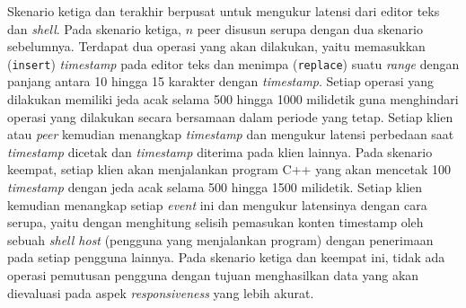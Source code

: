 Skenario ketiga dan terakhir berpusat untuk mengukur latensi dari editor teks dan \textit{shell}. Pada skenario ketiga, $n$ peer disusun serupa dengan dua skenario sebelumnya. Terdapat dua operasi yang akan dilakukan, yaitu memasukkan (\texttt{insert}) \textit{timestamp} pada editor teks dan menimpa (\texttt{replace}) suatu \textit{range} dengan panjang antara 10 hingga 15 karakter dengan \textit{timestamp}. Setiap operasi yang dilakukan memiliki jeda acak selama 500 hingga 1000 milidetik guna menghindari operasi yang dilakukan secara bersamaan dalam periode yang tetap. Setiap klien atau \textit{peer} kemudian menangkap \textit{timestamp} dan mengukur latensi perbedaan saat \textit{timestamp} dicetak dan \textit{timestamp} diterima pada klien lainnya. Pada skenario keempat, setiap klien akan menjalankan program C++ yang akan mencetak 100 \textit{timestamp} dengan jeda acak selama 500 hingga 1500 milidetik. Setiap klien kemudian menangkap setiap \textit{event} ini dan mengukur latensinya dengan cara serupa, yaitu dengan menghitung selisih pemasukan konten timestamp oleh sebuah \textit{shell host} (pengguna yang menjalankan program) dengan penerimaan pada setiap pengguna lainnya. Pada skenario ketiga dan keempat ini, tidak ada operasi pemutusan pengguna dengan tujuan menghasilkan data yang akan dievaluasi pada aspek \textit{responsiveness} yang lebih akurat.